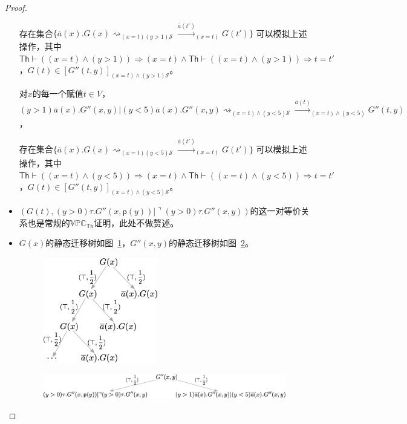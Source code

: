 \begin{proof}
\begin{itemize}
{\begin{itemize}
{               存在集合$\{\overline{a}(x).G(x)\rightsquigarrow_{(x=t)(y>1)\mathcal{S}}\stackrel{\overline{a}(t')}{\longrightarrow}_{(x=t)}G(t')\}$
               可以模拟上述操作，其中$\mathsf{Th}\vdash ((x=t)\wedge (y>1))\Rightarrow (x=t) \wedge \mathsf{Th}\vdash ((x=t)\wedge (y>1))\Rightarrow t=t'$，$G(t)\in [G''(t,y)]_{(x=t)\wedge (y>1)\mathcal{S}}$。
               
               对$x$的每一个赋值$t\in V$，
               $$(y>1)\overline{a}(x).G''(x,y)|(y<5)\overline{a}(x).G''(x,y)\rightsquigarrow_{(x=t)\wedge(y<5)\mathcal{S}}\stackrel{\overline{a}(t)}{\rightarrow}_{(x=t)\wedge(y<5)}G''(t,y)$$，
               
               存在集合$\{\overline{a}(x).G(x)\rightsquigarrow_{(x=t)(y<5)\mathcal{S}}\stackrel{\overline{a}(t')}{\longrightarrow}_{(x=t)}G(t')\}$
               可以模拟上述操作，其中$\mathsf{Th}\vdash ((x=t)\wedge (y<5))\Rightarrow (x=t) \wedge\mathsf{Th}\vdash ((x=t)\wedge (y<5))\Rightarrow t=t'$，$G(t)\in [G''(t,y)]_{(x=t)\wedge (y<5)\mathcal{S}}$。
            }
         \end{itemize}
      }
      \item {
         $(G(t),(y>0)\tau.G''(x,\mathsf{p}(y))|\urcorner (y>0)\tau.G''(x,y))$的这一对等价关系也是常规的$\mathbb{VPC}_{\mathsf{Th}}$证明，此处不做赘述。
      }
      \item {
         $G(x)$的静态迁移树如图~\ref{fig_eg4_1}，$G''(x,y)$的静态迁移树如图~\ref{fig_eg4_2}。
         \begin{figure}[!htbp]
            \small
            \centering
            \includegraphics[width=5cm]{../figures/example1.png}
            \caption[]{} 
            \label{fig_eg4_1}
         \end{figure}
         \begin{figure}[!htbp]
            \small
            \centering
            \includegraphics[width=13cm]{../figures/example4_2.png}
            \caption[]{} 
            \label{fig_eg4_2}
         \end{figure}

}
\end{itemize}
\end{proof}
